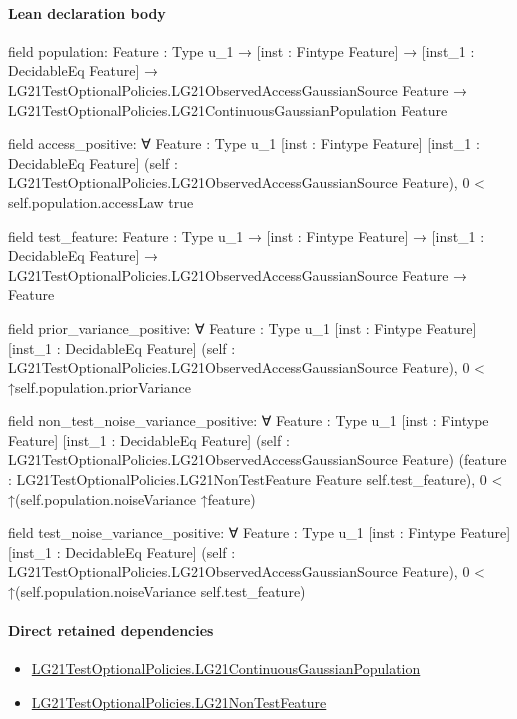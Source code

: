 \documentclass[10pt]{article}
\begin{document}
\paragraph{Lean declaration body}
\begin{ReviewVerbatim}
field population:
{Feature : Type u_1} →
  [inst : Fintype Feature] →
    [inst_1 : DecidableEq Feature] →
      LG21TestOptionalPolicies.LG21ObservedAccessGaussianSource Feature →
        LG21TestOptionalPolicies.LG21ContinuousGaussianPopulation Feature

field access_positive:
∀ {Feature : Type u_1} [inst : Fintype Feature] [inst_1 : DecidableEq Feature]
  (self : LG21TestOptionalPolicies.LG21ObservedAccessGaussianSource Feature), 0 < self.population.accessLaw {true}

field test_feature:
{Feature : Type u_1} →
  [inst : Fintype Feature] →
    [inst_1 : DecidableEq Feature] → LG21TestOptionalPolicies.LG21ObservedAccessGaussianSource Feature → Feature

field prior_variance_positive:
∀ {Feature : Type u_1} [inst : Fintype Feature] [inst_1 : DecidableEq Feature]
  (self : LG21TestOptionalPolicies.LG21ObservedAccessGaussianSource Feature), 0 < ↑self.population.priorVariance

field non_test_noise_variance_positive:
∀ {Feature : Type u_1} [inst : Fintype Feature] [inst_1 : DecidableEq Feature]
  (self : LG21TestOptionalPolicies.LG21ObservedAccessGaussianSource Feature)
  (feature : LG21TestOptionalPolicies.LG21NonTestFeature Feature self.test_feature),
  0 < ↑(self.population.noiseVariance ↑feature)

field test_noise_variance_positive:
∀ {Feature : Type u_1} [inst : Fintype Feature] [inst_1 : DecidableEq Feature]
  (self : LG21TestOptionalPolicies.LG21ObservedAccessGaussianSource Feature),
  0 < ↑(self.population.noiseVariance self.test_feature)
\end{ReviewVerbatim}

\paragraph{Direct retained dependencies}
\begin{itemize}\raggedright
\item \hyperlink{paper-prerequisite-f5e1c886d250142b}{LG21\allowbreak{}Test\allowbreak{}Optional\allowbreak{}Policies.\allowbreak{}LG21\allowbreak{}Continuous\allowbreak{}Gaussian\allowbreak{}Population}
\item \hyperlink{governing-declaration-81cb73bf3869c56d}{LG21\allowbreak{}Test\allowbreak{}Optional\allowbreak{}Policies.\allowbreak{}LG21\allowbreak{}Non\allowbreak{}Test\allowbreak{}Feature}
\end{itemize}
\hypertarget{governing-declaration-f2c986c14a1e4187}{}
\end{document}
